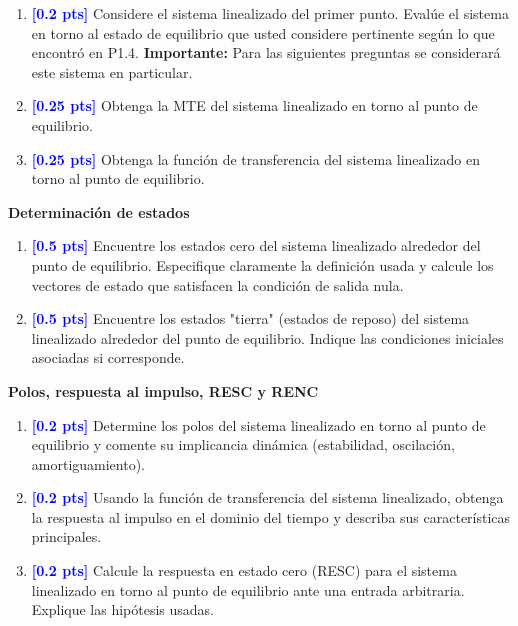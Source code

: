 \documentclass[
  11pt,
  letterpaper,
   addpoints,
  ]{exam}
\begin{document}
\begin{questions}
\begin{enumerate}
  \item \textcolor{blue}{\textbf{[0.2 pts]}} Considere el sistema linealizado del primer punto. Evalúe el sistema en torno al estado de equilibrio que usted considere pertinente según lo que encontró en P1.4. \textbf{Importante:} Para las siguientes preguntas se considerará este sistema en particular.

  \item \textcolor{blue}{\textbf{[0.25 pts]}} Obtenga la MTE del sistema linealizado en torno al punto de equilibrio.

  \item \textcolor{blue}{\textbf{[0.25 pts]}} Obtenga la función de transferencia del sistema linealizado en torno al punto de equilibrio.
\end{enumerate}

\question \textbf{Determinación de estados}
\begin{enumerate}
  \item \textcolor{blue}{\textbf{[0.5 pts]}} Encuentre los estados cero del sistema linealizado alrededor del punto de equilibrio. Especifique claramente la definición usada y calcule los vectores de estado que satisfacen la condición de salida nula.

  \item \textcolor{blue}{\textbf{[0.5 pts]}} Encuentre los estados "tierra" (estados de reposo) del sistema linealizado alrededor del punto de equilibrio. Indique las condiciones iniciales asociadas si corresponde.
\end{enumerate}

\question \textbf{Polos, respuesta al impulso, RESC y RENC}
\begin{enumerate}
  \item \textcolor{blue}{\textbf{[0.2 pts]}} Determine los polos del sistema linealizado en torno al punto de equilibrio y comente su implicancia dinámica (estabilidad, oscilación, amortiguamiento).

  \item \textcolor{blue}{\textbf{[0.2 pts]}} Usando la función de transferencia del sistema linealizado, obtenga la respuesta al impulso en el dominio del tiempo y describa sus características principales.

  \item \textcolor{blue}{\textbf{[0.2 pts]}} Calcule la respuesta en estado cero (RESC) para el sistema linealizado en torno al punto de equilibrio ante una entrada arbitraria. Explique las hipótesis usadas.


\end{enumerate}
\end{questions}
\end{document}
